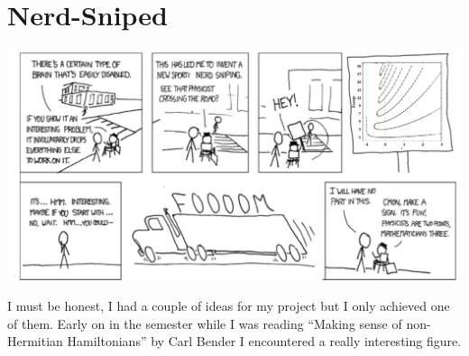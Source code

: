 \documentclass[10pt, a4paper, singlespacing]{report}
\newenvironment{Figure}
    {\par\medskip\noindent\minipage{\linewidth}}
    {\endminipage\par\medskip}
\begin{document}
\section{Nerd-Sniped}\label{Nerd}
\begin{Figure}
\centering
\includegraphics[width=\linewidth]{nerd_sniping.pdf}
\end{Figure}
I must be honest, I had a couple of ideas for my project but I only achieved one of them. Early on in the semester while I was reading ``Making sense of non-Hermitian Hamiltonians'' by Carl Bender I encountered a really interesting figure.
\end{document}
